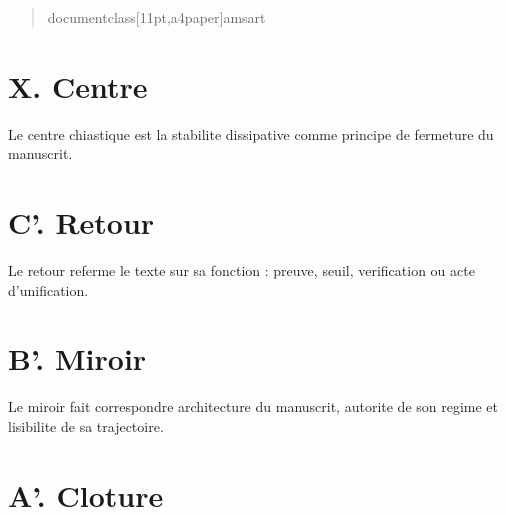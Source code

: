 ﻿\documentclass[11pt,a4paper]{article}
\begin{document}
\begin{quote}

documentclass[11pt,a4paper]{amsart} %

\end{quote}



\section*{X. Centre}

Le centre chiastique est la stabilite dissipative comme principe de fermeture du manuscrit.



\section*{C'. Retour}

Le retour referme le texte sur sa fonction : preuve, seuil, verification ou acte d'unification.



\section*{B'. Miroir}

Le miroir fait correspondre architecture du manuscrit, autorite de son regime et lisibilite de sa trajectoire.



\section*{A'. Cloture}
\end{document}
